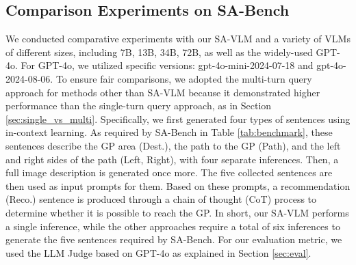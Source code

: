 \subsection{Comparison Experiments on SA-Bench}
\label{sec:comp_sota}
We conducted comparative experiments with our SA-VLM and a variety of VLMs of different sizes, including 7B, 13B, 34B, 72B, as well as the widely-used GPT-4o.
For GPT-4o, we utilized specific versions: gpt-4o-mini-2024-07-18 and gpt-4o-2024-08-06.
To ensure fair comparisons, we adopted the multi-turn query approach for methods other than SA-VLM because it demonstrated higher performance than the single-turn query approach, as in Section \ref{sec:single_vs_multi}.
Specifically, we first generated four types of sentences using in-context learning.
As required by SA-Bench in Table \ref{tab:benchmark}, these sentences describe the GP area (Dest.), the path to the GP (Path), and the left and right sides of the path (Left, Right), with four separate inferences.
Then, a full image description is generated once more. 
The five collected sentences are then used as input prompts for them.
Based on these prompts, a recommendation (Reco.) sentence is produced through a chain of thought (CoT) process to determine whether it is possible to reach the GP.
In short, our SA-VLM performs a single inference, while the other approaches require a total of six inferences to generate the five sentences required by SA-Bench. 
For our evaluation metric, we used the LLM Judge based on GPT-4o as explained in Section \ref{sec:eval}.

